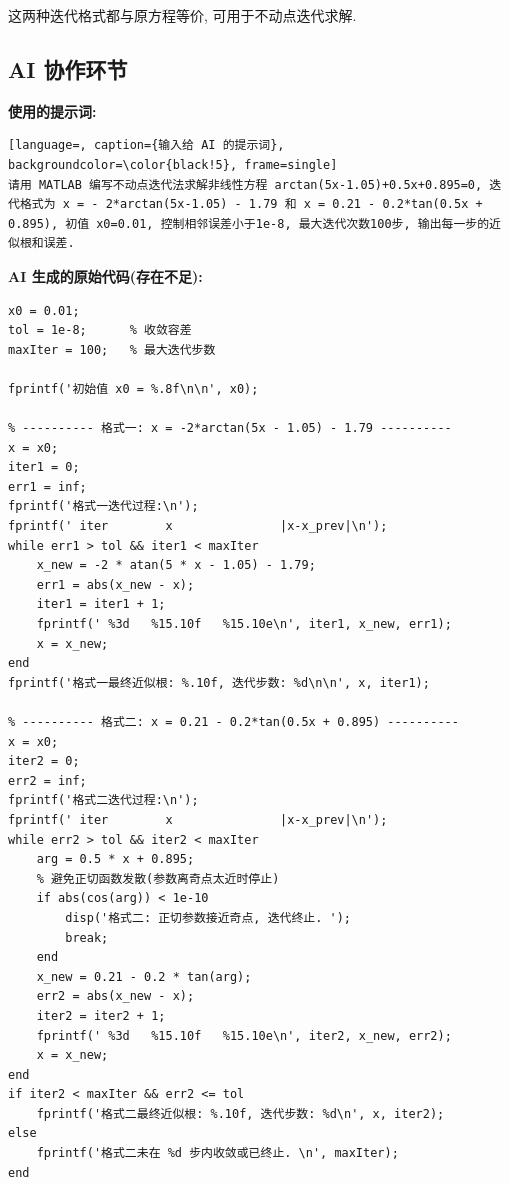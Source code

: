 \documentclass[12pt,a4paper]{ctexart}
\begin{document}
这两种迭代格式都与原方程等价, 可用于不动点迭代求解. 

\subsection{AI 协作环节}
\textbf{使用的提示词: }
\begin{lstlisting}[language=, caption={输入给 AI 的提示词}, backgroundcolor=\color{black!5}, frame=single]
请用 MATLAB 编写不动点迭代法求解非线性方程 arctan(5x-1.05)+0.5x+0.895=0, 迭代格式为 x = - 2*arctan(5x-1.05) - 1.79 和 x = 0.21 - 0.2*tan(0.5x + 0.895), 初值 x0=0.01, 控制相邻误差小于1e-8, 最大迭代次数100步, 输出每一步的近似根和误差. 
\end{lstlisting}

\textbf{AI 生成的原始代码(存在不足): }
\begin{lstlisting}[caption={AI 原始代码}, label=code:ai_raw]
% 定义两种迭代格式, 初值 x0 = 0.01
x0 = 0.01;
tol = 1e-8;      % 收敛容差
maxIter = 100;   % 最大迭代步数

fprintf('初始值 x0 = %.8f\n\n', x0);

% ---------- 格式一: x = -2*arctan(5x - 1.05) - 1.79 ----------
x = x0;
iter1 = 0;
err1 = inf;
fprintf('格式一迭代过程:\n');
fprintf(' iter        x               |x-x_prev|\n');
while err1 > tol && iter1 < maxIter
    x_new = -2 * atan(5 * x - 1.05) - 1.79;
    err1 = abs(x_new - x);
    iter1 = iter1 + 1;
    fprintf(' %3d   %15.10f   %15.10e\n', iter1, x_new, err1);
    x = x_new;
end
fprintf('格式一最终近似根: %.10f, 迭代步数: %d\n\n', x, iter1);

% ---------- 格式二: x = 0.21 - 0.2*tan(0.5x + 0.895) ----------
x = x0;
iter2 = 0;
err2 = inf;
fprintf('格式二迭代过程:\n');
fprintf(' iter        x               |x-x_prev|\n');
while err2 > tol && iter2 < maxIter
    arg = 0.5 * x + 0.895;
    % 避免正切函数发散(参数离奇点太近时停止) 
    if abs(cos(arg)) < 1e-10
        disp('格式二: 正切参数接近奇点, 迭代终止. ');
        break;
    end
    x_new = 0.21 - 0.2 * tan(arg);
    err2 = abs(x_new - x);
    iter2 = iter2 + 1;
    fprintf(' %3d   %15.10f   %15.10e\n', iter2, x_new, err2);
    x = x_new;
end
if iter2 < maxIter && err2 <= tol
    fprintf('格式二最终近似根: %.10f, 迭代步数: %d\n', x, iter2);
else
    fprintf('格式二未在 %d 步内收敛或已终止. \n', maxIter);
end
\end{lstlisting}
\end{document}
